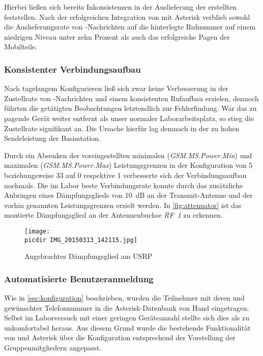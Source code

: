 Hierbei ließen sich bereits Inkonsistenzen in der Auslieferung der erstellten \SMS feststellen. Nach der erfolgreichen Integration von \OpenBTS mit Asterisk verblieb sowohl die Auslieferungsrate von \SMS-Nachrichten auf die hinterlegte Rufnummer auf einem niedrigen Niveau unter zehn Prozent als auch das erfolgreiche Pagen der Mobilteile.
\subsubsection{Konsistenter Verbindungsaufbau}
Nach tagelangem Konfigurieren ließ sich zwar keine Verbesserung in der Zustellrate von \SMS-Nachrichten und einem konsistenten Rufaufbau erzielen, dennoch führten die getätigten Beobachtungen letztendlich zur Fehlerfindung. War das zu pagende Gerät weiter entfernt als unser normaler Laborarbeitsplatz, so stieg die Zustellrate signifikant an.
Die Ursache hierfür lag demnach in der zu hohen Sendeleistung der Basisstation.

Durch ein Absenken der voreingestellten minimalen (\emph{GSM.MS.Power.Min}) und maximalen (\emph{GSM.MS.Power.Max}) Leistungsgrenzen in der Konfiguration von \SI{5}{\dBm} beziehungsweise \SI{33}{\dBm} auf \SI{0}{\dBm} respektive \SI{1}{\dBm} verbesserte sich der Verbindungsaufbau nochmals. 
Die im Labor beste Verbindungsrate konnte durch das zusätzliche Anbringen eines Dämpfungsglieds von \SI{10}{\dB} an der Transmit-Antenne und der vorhin genannten Leistungsgrenzen erzielt werden. 
In \autoref{fig:attenuator} ist das montierte Dämpfungsglied an der Antennenbuchse \emph{RF~1} zu erkennen.

\begin{figure}[h!]
	\centering
	\texttt{[image: \\picdir IMG\_20150313\_142115.jpg]}
	\caption{Angebrachtes Dämpfungsglied am \acs*{USRP}}
	\label{fig:attenuator}
\end{figure}


\subsubsection{Automatisierte Benutzeranmeldung}
Wie in \autoref{sec:konfiguration} beschrieben, wurden die Teilnehmer mit deren \IMSI und gewünschter Telefonnummer in die Asterisk-Datenbank von Hand eingetragen. Selbst im Laborversuch mit einer geringen Geräteanzahl stellte sich dies als zu unkomfortabel heraus.
Aus diesem Grund wurde die bestehende Funktionalität von \OpenBTS und Asterisk über die Konfiguration entsprechend der Vorstellung der Gruppenmitgliedern angepasst.

